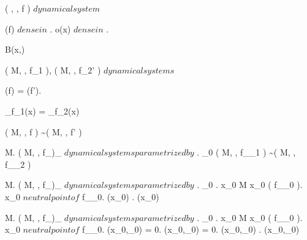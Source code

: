 \documentclass[../Main/main]{subfiles}
\begin{document}
{	
	{
		{
			( \R, \N, f ) $ dynamical system $
		}
		{
			\fixed(f) $ dense in $ \R.
			{
				o(x) $ dense in $ \R
			}.

			{
				\ex{ \epsilon \in \R^+ }
				{
					\all{ \delta \in \R^+ }
					{
						{
							 \nin B(x,\epsilon)
						}
					}
				}
			}
		}
	}	
	
	
	{
		{
			( M, \N, f_1 ), ( M, \N, f_2' ) $ dynamical systems $
		}
		{
			\fixed(f) = \fixed(f').

			\all{ x \in \fixed(f) }
			{
				\chi_{f_1}(x) = \chi_{f_2}(x)
			}
		}
		\denote
		{
			( M, \N, f ) \sim ( M, \N, f' )
		}
	}
	
	
	{
		{
			\Lambda \subset M.
			( M, \N, f_\lambda )_{\lambda \in \Lambda} $ dynamical systems parametrized by $ \Lambda.
			\lambda_0 \in \Lambda
		}
		{
			\all{ \epsilon \in \R^+ }
			{
				{
					( M, \N, f_{\lambda_1} ) \not\sim ( M, \N, f_{\lambda_2} )
				}
			}
		}
	}
	
	
	{
		{
			\Lambda \subset M.
			( M, \N, f_\lambda )_{\lambda \in \Lambda} $ dynamical systems parametrized by $ \Lambda.
			\lambda_0 \in \Lambda.
			x_0 \in M
		}
		{
			x_0 \in \fixed( f_{\lambda_0} ).
			x_0 $ neutral point of $ f_{\lambda_0}.
			(x_0) .
			(x_0) 
		}
	}
	
	
	{
		{
			\Lambda \subset M.
			( M, \N, f_\lambda )_{\lambda \in \Lambda} $ dynamical systems parametrized by $ \Lambda.
			\lambda_0 \in \Lambda.
			x_0 \in M
		}
		{
			x_0 \in \fixed( f_{\lambda_0} ).
			x_0 $ neutral point of $ f_{\lambda_0}.
			(x_0,\lambda_0) = 0.
			(x_0,\lambda_0) = 0.
			(x_0,\lambda_0) .
			(x_0,\lambda_0) 
		}
	}
	
}
\end{document}
